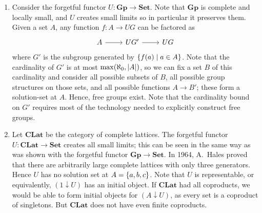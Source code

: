 \begin{example}
    \begin{enumerate}
        \item Consider the forgetful functor \( U : \mathbf{Gp} \to \mathbf{Set} \).
        Note that \( \mathbf{Gp} \) is complete and locally small, and \( U \) creates small limits so in particular it preserves them.
        Given a set \( A \), any function \( f : A \to UG \) can be factored as
\[\begin{tikzcd}
	A & {UG'} & UG
	\arrow[from=1-1, to=1-2]
	\arrow[from=1-2, to=1-3]
\end{tikzcd}\]
        where \( G' \) is the subgroup generated by \( \qty{f(a) \mid a \in A} \).
        Note that the cardinality of \( G' \) is at most \( \max(\aleph_0, \abs{A}) \), so we can fix a set \( B \) of this cardinality and consider all possible subsets of \( B \), all possible group structures on those sets, and all possible functions \( A \to B' \); these form a solution-set at \( A \).
        Hence, free groups exist.
        Note that the cardinality bound on \( G' \) requires most of the technology needed to explicitly construct free groups.
        \item Let \( \mathbf{CLat} \) be the category of complete lattices.
        The forgetful functor \( U : \mathbf{CLat} \to \mathbf{Set} \) creates all small limits; this can be seen in the same way as was shown with the forgetful functor \( \mathbf{Gp} \to \mathbf{Set} \).
        In 1964, A.\ Hales proved that there are arbitrarily large complete lattices with only three generators.
        Hence \( U \) has no solution set at \( A = \qty{a, b, c} \).
        Note that \( U \) is representable, or equivalently, \( (1 \downarrow U) \) has an initial object.
        If \( \mathbf{CLat} \) had all coproducts, we would be able to form initial objects for \( (A \downarrow U) \), as every set is a coproduct of singletons.
        But \( \mathbf{CLat} \) does not have even finite coproducts.
    \end{enumerate}
\end{example}

